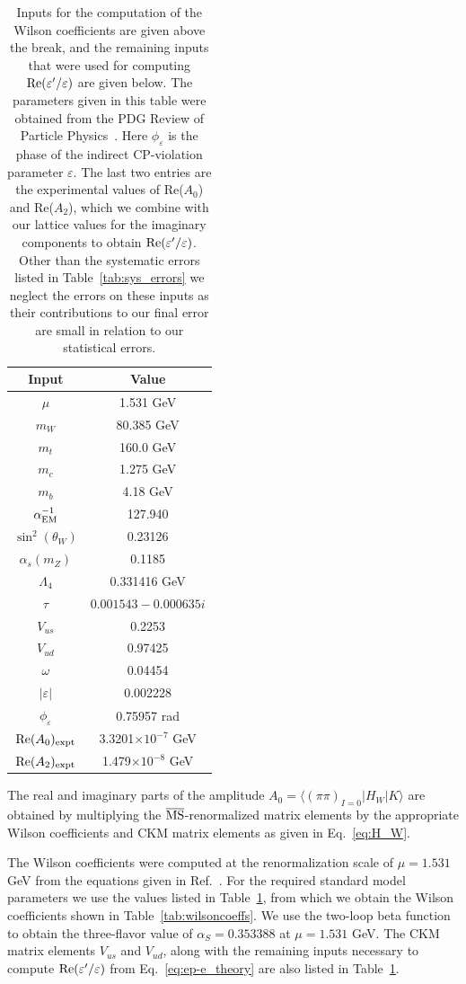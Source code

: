 \documentclass[aps,prl,
superscriptaddress,
showpacs,
preprintnumbers,
bibnotes,
amsmath,
amssymb,
twocolumn,
floatfix,
]{revtex4-1}
\begin{document}
\begin{table}
\begin{tabular}{c|c}
\hline\hline
Input & Value  \\
\hline
$\mu$ & 1.531 GeV \\
$m_W$ & 80.385 GeV \\
$m_t$ & 160.0 GeV \\
$m_c$ & 1.275 GeV \\
$m_b$ & 4.18 GeV \\
$\alpha_{\rm EM}^{-1}$ & 127.940 \\ 
$\sin^2(\theta_W)$ & 0.23126 \\
$\alpha_s(m_Z)$ & 0.1185 \\
$\Lambda_4$ & 0.331416 GeV\\
\hline
$\tau$ & $0.001543 -0.000635i$  \\
$V_{us}$ & 0.2253 \\
$V_{ud}$ & 0.97425 \\
$\omega$ & 0.04454\\
$|\varepsilon|$ & 0.002228 \\
$\phi_\varepsilon$ & 0.75957 rad\\
${\rm Re}(A_0)_{\rm expt}$ & 3.3201$\times 10^{-7}$ GeV\\
${\rm Re}(A_2)_{\rm expt}$ & 1.479$\times 10^{-8}$ GeV\\
\end{tabular}
\caption{Inputs for the computation of the Wilson coefficients are given above the break, and the remaining inputs that were used for computing ${\rm Re}(\varepsilon'/\varepsilon)$ are given below.  The parameters given in this table were obtained from the PDG Review of Particle Physics~\cite{Agashe:2014kda}. Here $\phi_\varepsilon$ is the phase of the indirect CP-violation parameter $\varepsilon$. The last two entries are the experimental values of Re($A_0$) and Re($A_2$), which we combine with our lattice values for the imaginary components to obtain ${\rm Re}(\varepsilon'/\varepsilon)$. Other than the systematic errors listed in Table~\ref{tab:sys_errors}
we neglect the errors on these inputs as their contributions to our final error are small in relation to our statistical errors.
\label{tab:inputconsts} }
\end{table}

The real and imaginary parts of the amplitude $A_0 = \langle (\pi\pi)_{I=0}|H_W|K\rangle$ are obtained by multiplying the $\overline{\rm MS}$-renormalized matrix elements by the appropriate Wilson coefficients and CKM matrix elements as given in Eq.~\eqref{eq:H_W}.
 
The Wilson coefficients were computed at the renormalization scale of $\mu=1.531$ GeV from the equations given in Ref.~\cite{Buchalla:1995vs}.  For the required standard model parameters we use the values listed in Table~\ref{tab:inputconsts}, from which we obtain the Wilson coefficients shown in Table~\ref{tab:wilsoncoeffs}. We use the two-loop beta function to obtain the three-flavor value of $\alpha_S = 0.353388$ at $\mu = 1.531$ GeV. The CKM matrix elements $V_{us}$ and $V_{ud}$, along with the remaining inputs necessary to compute ${\rm Re}(\varepsilon'/\varepsilon)$ from Eq.~\eqref{eq:ep-e_theory} are also listed in Table~\ref{tab:inputconsts}.
\end{document}
